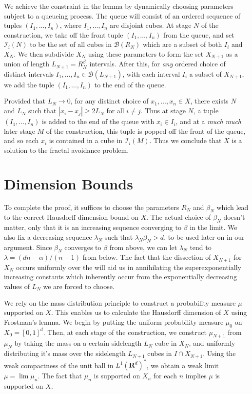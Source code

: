 \documentclass{article}
\theoremstyle{plain}
\theoremstyle{plain}
\begin{document}

We achieve the constraint in the lemma by dynamically choosing parameters subject to a queueing process. The queue will consist of an ordered sequence of tuples $(I_1, \dots, I_n)$, where $I_1 ,\dots, I_n$ are disjoint cubes. At stage $N$ of the construction, we take off the front tuple $(I_1, \dots, I_n)$ from the queue, and set $\mathcal{I}_i(N)$ to be the set of all cubes in $\mathcal{B}(R_N)$ which are a subset of both $I_i$ and $X_N$. We then subdivide $X_N$ using these parameters to form the set $X_{N+1}$ as a union of length $L_{N+1} = R_N^\beta$ intervals. After this, for {\it any} ordered choice of distinct intervals $I_1, \dots, I_n \in \mathcal{B}(L_{N+1})$, with each interval $I_i$ a subset of $X_{N+1}$, we add the tuple $(I_1, \dots, I_n)$ to the end of the queue.

Provided that $L_N \to 0$, for any distinct choice of $x_1, \dots, x_n \in X$, there exists $N$ and $L_N$ such that $|x_i - x_j| \geq 2 L_N$ for all $i \neq j$. Thus at stage $N$, a tuple $(I_1, \dots, I_n)$ is added to the end of the queue with $x_i \in I_i$, and at a {\it much} {\it much} later stage $M$ of the construction, this tuple is popped off the front of the queue, and so each $x_i$ is contained in a cube in $\mathcal{I}_i(M)$. Thus we conclude that $X$ is a solution to the fractal avoidance problem.

\section{Dimension Bounds}

To complete the proof, it suffices to choose the parameters $R_N$ and $\beta_N$ which lead to the correct Hausdorff dimension bound on $X$. The actual choice of $\beta_N$ doesn't matter, only that it is an increasing sequence converging to $\beta$ in the limit. We also fix a decreasing sequence $\lambda_N$ such that $\lambda_N \beta_N > d$, to be used later on in our argument. Since $\beta_N$ converges to $\beta$ from above, we can let $\lambda_N$ tend to $\lambda = (dn - \alpha)/(n - 1)$ from below. The fact that the dissection of $X_{N+1}$ for $X_N$ occurs uniformly over the will aid us in annihilating the superexponentially increasing constants which inherently occur from the exponentially decreasing values of $L_N$ we are forced to choose.

We rely on the mass distribution principle to construct a probability measure $\mu$ supported on $X$. This enables us to calculate the Hausdorff dimension of $X$ using Frostman's lemma. We begin by putting the uniform probability measure $\mu_0$ on $X_0 = [0,1]^d$. Then, at each stage of the construction, we construct $\mu_{N+1}$ from $\mu_N$ by taking the mass on a certain sidelength $L_N$ cube in $X_N$, and uniformly distributing it's mass over the sidelength $L_{N+1}$ cubes in $I \cap X_{N+1}$. Using the weak compactness of the unit ball in $L^1(\mathbf{R}^d)^*$, we obtain a weak limit $\mu = \lim \mu_n$. The fact that $\mu_n$ is supported on $X_n$ for each $n$ implies $\mu$ is supported on $X$.
\end{document}
